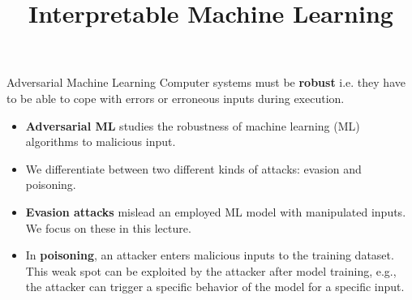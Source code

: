 \documentclass[11pt,compress,t,notes=noshow, aspectratio=169, xcolor=table]{beamer}
\title{Interpretable Machine Learning}
\date{}
\begin{document}
\newcommand{\vertiii}[1]{{\left\vert\kern-0.25ex\left\vert\kern-0.25ex\left\vert #1 
    \right\vert\kern-0.25ex\right\vert\kern-0.25ex\right\vert}}


 \newcommand{\titlefigure}{figure/AEturtle.jpg}
\newcommand{\learninggoals}{
\item Understand the definition of AEs and their relation to Counterfactual Explanations
\item Understand different methods that generate AEs
\item Discuss potential causes of AEs and standard defenses against them}



\begin{vbframe}{Adversarial Machine Learning}
Computer systems must be \textbf{robust} i.e. they have to be able to cope with errors or erroneous inputs during execution.
\begin{itemize}
\item \textbf{Adversarial ML} studies the robustness of machine learning (ML) algorithms to malicious input.
\item We differentiate between two different kinds of attacks: evasion and poisoning.
\item \textbf{Evasion attacks} mislead an employed ML model with manipulated inputs. We focus on these in this lecture.
\item In \textbf{poisoning}, an attacker enters malicious inputs to the training dataset. This weak spot can be exploited by the attacker after model training, e.g., the attacker can trigger a specific behavior of the model for a specific input. 
\end{itemize}
\end{vbframe}
\end{document}
